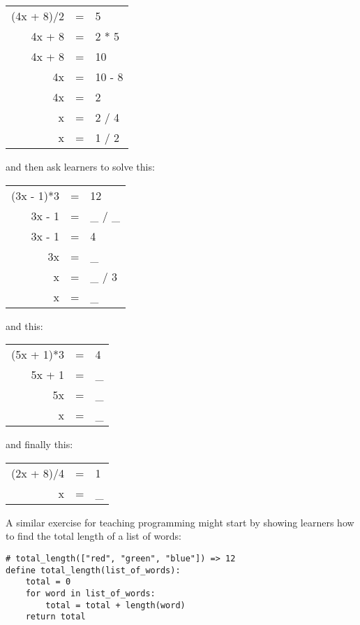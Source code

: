 \begin{center}
\begin{tabular}{rcl}
  (4x + 8)/2	& = &	5	\\
  4x + 8	& = &	2 * 5	\\
  4x + 8	& = &	10	\\
  4x		& = &	10 - 8	\\
  4x		& = &	2	\\
  x		& = &	2 / 4	\\
  x		& = &	1 / 2
\end{tabular}
\end{center}

\noindent
and then ask learners to solve this:

\begin{center}
\begin{tabular}{rcl}
  (3x - 1)*3	& = &	12	\\
  3x - 1	& = &	\_ / \_	\\
  3x - 1	& = &	4	\\
  3x		& = &	\_	\\
  x		& = &	\_ / 3	\\
  x		& = &	\_
\end{tabular}
\end{center}

\noindent
and this:

\begin{center}
\begin{tabular}{rcl}
  (5x + 1)*3	& = &	4	\\
  5x + 1	& = &	\_ 	\\
  5x		& = &	\_ 	\\
  x		& = &	\_
\end{tabular}
\end{center}

\noindent
and finally this:

\begin{center}
\begin{tabular}{rcl}
  (2x + 8)/4	& = &	1	\\
   x		& = &	\_
\end{tabular}
\end{center}

A similar exercise for teaching programming might start by showing learners
how to find the total length of a list of words:

\begin{verbatim}
# total_length(["red", "green", "blue"]) => 12
define total_length(list_of_words):
    total = 0
    for word in list_of_words:
        total = total + length(word)
    return total
\end{verbatim}

